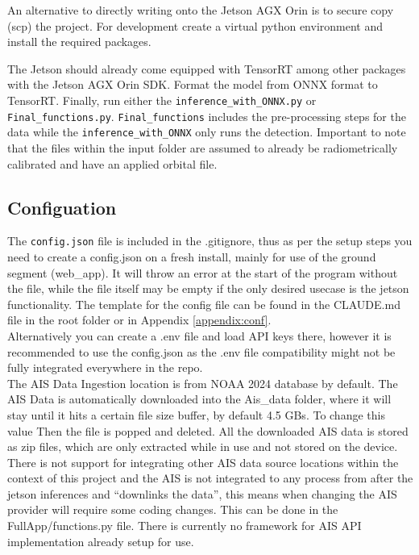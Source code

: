\documentclass{article}
\begin{document}
	An alternative to directly writing onto the Jetson AGX Orin is to secure copy (scp) the project. For development create a virtual python environment and install the required packages. 
	
	The Jetson should already come equipped with TensorRT among other packages with the Jetson AGX Orin SDK. Format the model from ONNX format to TensorRT. Finally, run either the \texttt{inference\_with\_ONNX.py} or \texttt{Final\_functions.py}. \texttt{Final\_functions} includes the pre-processing steps for the data while the \texttt{inference\_with\_ONNX} only runs the detection. Important to note that the files within the input folder are assumed to already be radiometrically calibrated and have an applied orbital file.
	
	
	
	
	\subsection{Configuation}
	
	The \texttt{config.json} file is included in the .gitignore, thus as per the setup steps you need to create a config.json on a fresh install, mainly for use of the ground segment (web\_app). It will throw an error at the start of the program without the file, while the file itself may be empty if the only desired usecase is the jetson functionality. The template for the config file can be found in the CLAUDE.md file in the root folder or in Appendix \ref{appendix:conf}.\\
	
	Alternatively you can create a .env file and load API keys there, however it is recommended to use the config.json as the .env file compatibility might not be fully integrated everywhere in the repo.\\
	
	The AIS Data Ingestion location is from NOAA 2024 database by default. The AIS Data is automatically downloaded into the Ais\_data folder, where it will stay until it hits a certain file size buffer, by default 4.5 GBs. To change this value Then the file is popped and deleted. All the downloaded AIS data is stored as zip files, which are only extracted while in use and not stored on the device. \\
	
	There is not support for integrating other AIS data source locations within the context of this project and the AIS is not integrated to any process from after the jetson inferences and “downlinks the data”, this means when changing the AIS provider will require some coding changes. This can be done in the FullApp/functions.py file. There is currently no framework for AIS API implementation already setup for use.\\
	
\end{document}

